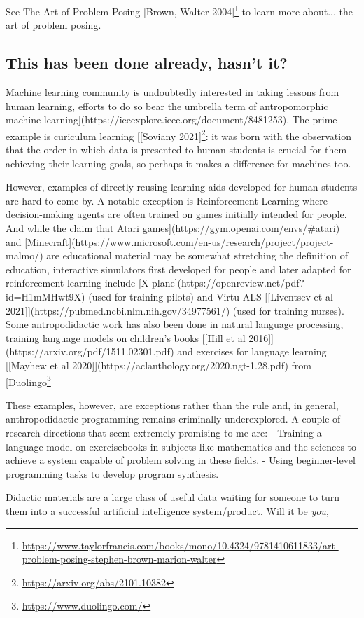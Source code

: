 See The Art of Problem Posing [Brown, Walter 2004]\footnote{\url{https://www.taylorfrancis.com/books/mono/10.4324/9781410611833/art-problem-posing-stephen-brown-marion-walter}} to learn more about... the art of problem posing.

\subsection{This has been done already, hasn't it?}

Machine learning community is undoubtedly interested in taking lessons from human learning, efforts to do so bear the umbrella term of antropomorphic machine learning](https://ieeexplore.ieee.org/document/8481253). The prime example is curiculum learning [[Soviany 2021]\footnote{\url{https://arxiv.org/abs/2101.10382}}: it was born with the observation that the order in which data is presented to human students is crucial for them achieving their learning goals, so perhaps it makes a difference for machines too.

However, examples of directly reusing learning aids developed for human students are hard to come by. A notable exception is Reinforcement Learning where decision-making agents are often trained on games initially intended for people. And while the claim that Atari games](https://gym.openai.com/envs/#atari) and [Minecraft](https://www.microsoft.com/en-us/research/project/project-malmo/) are educational material may be somewhat stretching the definition of education, interactive simulators first developed for people and later adapted for reinforcement learning include [X-plane](https://openreview.net/pdf?id=H1mMHwt9X) (used for training pilots) and Virtu-ALS [[Liventsev et al 2021]](https://pubmed.ncbi.nlm.nih.gov/34977561/) (used for training nurses). Some antropodidactic work has also been done in natural language processing, training language models on children's books [[Hill et al 2016]](https://arxiv.org/pdf/1511.02301.pdf) and exercises for language learning [[Mayhew et al 2020]](https://aclanthology.org/2020.ngt-1.28.pdf) from [Duolingo\footnote{\url{https://www.duolingo.com/}}

These examples, however, are exceptions rather than the rule and, in general, anthropodidactic programming remains criminally underexplored. A couple of research directions that seem extremely promising to me are:
- Training a language model on exercisebooks in subjects like mathematics and the sciences to achieve a system capable of problem solving in these fields.
- Using beginner-level programming tasks to develop program synthesis.

Didactic materials are a large class of useful data waiting for someone to turn them into a successful artificial intelligence system/product. Will it be \emph{you}, %